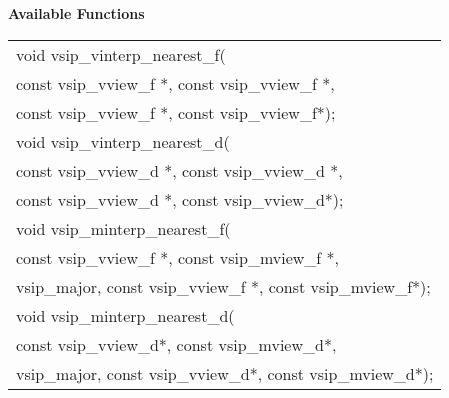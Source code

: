 \cvsiplh
\newline \hspace*{.8cm} \vspace*{.1cm} \textbf{Available Functions }
\newline \hspace*{1.1cm} {
\ttfamily
\begin{tabular}[H]{l}
void vsip\_vinterp\_nearest\_f(\\*\hspace*{1cm}const vsip\_vview\_f *, const vsip\_vview\_f *,
\\*\hspace*{1cm}const vsip\_vview\_f *, const vsip\_vview\_f*);\\
void vsip\_vinterp\_nearest\_d(\\*\hspace*{1cm}const vsip\_vview\_d *, const vsip\_vview\_d *,
\\*\hspace*{1cm}const vsip\_vview\_d *, const vsip\_vview\_d*);\\
void vsip\_minterp\_nearest\_f(\\*\hspace*{1cm}const vsip\_vview\_f *, const vsip\_mview\_f *,
\\*\hspace*{1cm}vsip\_major, const vsip\_vview\_f *, const vsip\_mview\_f*);\\
void vsip\_minterp\_nearest\_d(\\*\hspace*{1cm}const vsip\_vview\_d*, const vsip\_mview\_d*,
\\*\hspace*{1cm}vsip\_major, const vsip\_vview\_d*, const vsip\_mview\_d*);\\
\end{tabular}
}\\
\pyjvsiph
